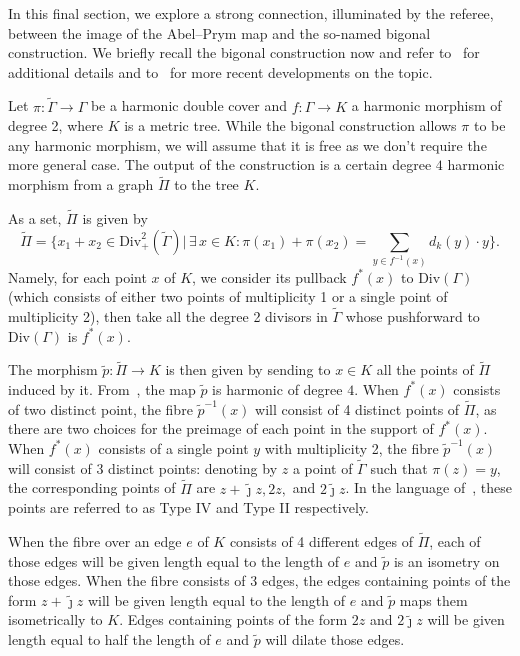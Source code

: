 \documentclass[11pt]{article}
\theoremstyle{definition}
\numberwithin{equation}{section}
\theoremstyle{definition}
\newcommand{\tGa}{\widetilde{\Gamma}}
\newcommand{\tj}{\widetilde{\jmath}}
\newcommand{\wt}[1]{\widetilde{#1}}
\begin{document}
In this final section, we explore a strong connection, illuminated by the referee, between the image of the Abel--Prym map and the so-named bigonal construction.
We briefly recall the bigonal construction now and  refer to~\cite{RZ_ngonal} for additional details and to~\cite{Zakharov_Trigonal, RohrleSaillez_Donagi} for more recent developments on the topic.


Let $\pi\colon \wt\Gamma\to \Gamma$ be a harmonic double cover and $f\colon \Gamma \to K$
a harmonic morphism of degree 2, where $K$ is a metric tree. While the bigonal construction allows $\pi$ to be any harmonic morphism,  we will assume that it is free as we don't require the more general case. 
The output of the construction
 is a certain degree $4$ harmonic morphism from a graph $\wt\Pi$ to the tree $K$. 

 
As a set, $\wt \Pi$  is
given by
\[
\wt{\Pi}=\{x_1+x_2\in \mathrm{Div}^2_+(\tGa)\big|\,\exists\, x\in K : \pi(x_1)+\pi(x_2)=\sum_{y\in f^{-1}(x)}d_k(y)\cdot y\}.
\]
Namely, for each point $x$ of $K$, we consider its pullback $f^*(x)$ to $\mathrm{Div}(\Gamma)$ (which consists of either two points of multiplicity 1 or a single point of multiplicity 2), then take all the degree 2 divisors in $\wt\Gamma$ whose pushforward to $\mathrm{Div}(\Gamma)$ is $f^*(x)$. 


The morphism $\tilde p:\wt \Pi\to K$ is then given by sending to $x\in K$ all the points of $\wt \Pi$ induced by it. 
From~\cite[Proposition 2.1]{RZ_ngonal}, the map $\tilde p$ is harmonic of degree $4$. When $f^*(x)$ consists of two distinct point, the fibre $\tilde p^{-1}(x)$ will consist of 4 distinct points of $\wt \Pi$, as there are two choices for the preimage of each point in the support of $f^*(x)$.  
When  $f^*(x)$ consists of a single point $y$ with multiplicity 2, the fibre $\tilde p^{-1}(x)$ will consist of $3$ distinct points:  denoting by $z$ a point of $\wt\Gamma$ such that $\pi(z) = y$,  the corresponding points of $\wt \Pi$ are $z+\tj z, 2z,$ and $2\tj z$. In the language of~\cite{RZ_ngonal}, these points are referred to as Type IV and Type II respectively. 

When the fibre over an edge $e$ of $K$ consists of 4 different edges of $\wt \Pi$, each of those edges will be given length equal to the length of $e$ and $\tilde p$ is an isometry on those edges. When the fibre consists of 3 edges, the edges containing points of the form $z+\tj z$ will be  given length equal to the length of $e$ and $\tilde p$ maps them isometrically to $K$. 
Edges containing points of the form 
$2z$ and $2\tj z$ will be given  length equal to half the length of $e$ and $\tilde p$ will dilate those edges. 
\end{document}
